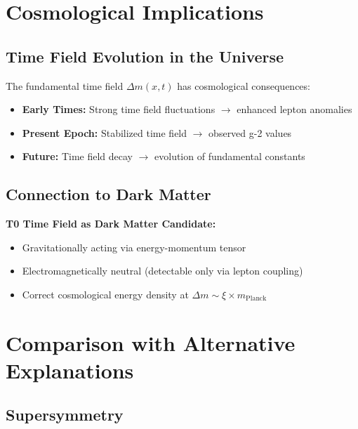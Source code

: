 \documentclass[12pt,a4paper]{article}
\newcommand{\xipar}{\xi}
\newcommand{\Deltam}{\Delta m}
\begin{document}
	\section{Cosmological Implications}
	
	\subsection{Time Field Evolution in the Universe}
	
	The fundamental time field $\Deltam(x,t)$ has cosmological consequences:
	
	\begin{itemize}
		\item \textbf{Early Times:} Strong time field fluctuations $\rightarrow$ enhanced lepton anomalies
		\item \textbf{Present Epoch:} Stabilized time field $\rightarrow$ observed g-2 values
		\item \textbf{Future:} Time field decay $\rightarrow$ evolution of fundamental constants
	\end{itemize}
	
	\subsection{Connection to Dark Matter}
	
	\begin{keyresult}
		\textbf{T0 Time Field as Dark Matter Candidate:}
		
		\begin{itemize}
			\item Gravitationally acting via energy-momentum tensor
			\item Electromagnetically neutral (detectable only via lepton coupling)
			\item Correct cosmological energy density at $\Deltam \sim \xipar \times m_{\text{Planck}}$
		\end{itemize}
	\end{keyresult}
	
	\section{Comparison with Alternative Explanations}
	
	\subsection{Supersymmetry}
	
\end{document}
